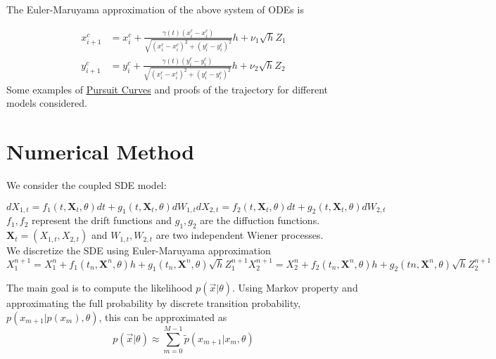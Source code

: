 \documentclass[a4paper,11pt]{article}
\begin{document}
The Euler-Maruyama approximation of the above system of ODEs is

\begin{align*}
x^{c}_{i+1} & = x^{c}_{i} + \frac{\gamma(t) (x^{r}_{i} - x^{c}_{i})}{\sqrt{(x^{r}_{i} - x^{c}_{i})^2 + (y^{r}_{i} - y^{c}_{i})^2}} h + \nu_1 \sqrt{h} Z_1 \\
y^{c}_{i+1} & = y^{c}_{i} + \frac{\gamma(t) (y^{r}_{i} - y^{c}_{i})}{\sqrt{(x^{r}_{i} - x^{c}_{i})^2 + (y^{r}_{i} - y^{c}_{i})^2}}h + \nu_2 \sqrt{h} Z_2
\end{align*}
Some examples of  \href{http://home2.fvcc.edu/~dhicketh/DiffEqns/Spring11projects/Jonah_Franchi_Katy_Steiner/Diff%20EQ%20Project.pdf}{Pursuit Curves} and proofs of the trajectory for different models considered.

\section{Numerical Method}
We consider the coupled SDE model:

\begin{subequations}
\begin{equation}
d X_{1,t} = f_{1} (t, \mathbf{X}_t, \theta) dt + g_{1} (t, \mathbf{X}_t, \theta) dW_{1,t}
\end{equation}    
\begin{equation}
d X_{2,t} = f_{2} (t, \mathbf{X}_t, \theta) dt + g_{2} (t, \mathbf{X}_t, \theta) dW_{2,t}
\end{equation}
\end{subequations}
$f_1, f_2$ represent the drift functions and $g_1, g_2$ are the diffuction functions. $\mathbf{X}_t = (X_{1,t}, X_{2,t})$ and $W_{1,t}, W_{2,t}$ are two independent Wiener processes. \\

We discretize the SDE using Euler-Maruyama approximation
\begin{subequations}
\begin{equation}
X_{1}^{n+1} = X^n_1 + f_{1} (t_n, \mathbf{X}^{n}, \theta) h + g_{1} (t_n, \mathbf{X}^n, \theta) \sqrt{h} Z^{n+1}_1
\end{equation}    
\begin{equation}
X_{2}^{n+1} = X^n_2 + f_{2} (t_n, \mathbf{X}^{n}, \theta) h + g_{2} (tn, \mathbf{X}^n, \theta) \sqrt{h} Z^{n+1}_2
\end{equation}
\end{subequations}

The main goal is to compute the likelihood $p(\vec{x} | \theta)$. Using Markov property and approximating the full probability by discrete transition probability, $p(x_{m+1} | p(x_m), \theta)$, this can be approximated as
$$
p(\vec{x} | \theta) \approx \sum_{m=0}^{M-1} \tilde{p}(x_{m+1} | x_m , \theta)
$$
\end{document}
